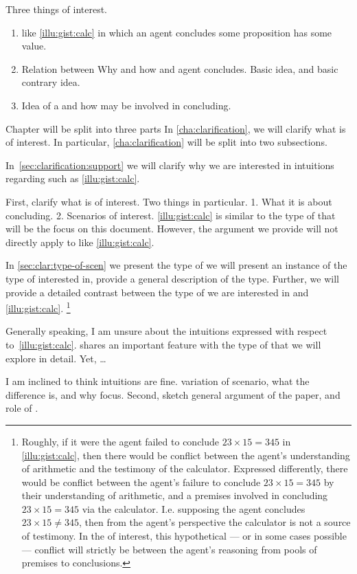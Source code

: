\begin{note}
  Three things of interest.

  \begin{enumerate}
  \item
     like \autoref{illu:gist:calc} in which an agent concludes some proposition has some value.
  \item
    Relation between Why and how and agent concludes.
    Basic idea, and basic contrary idea.
  \item
    Idea of a \fc{} and how  may be involved in concluding.
  \end{enumerate}


  Chapter will be split into three parts
  In \autoref{cha:clarification}, we will clarify what is of interest.
  In particular, \autoref{cha:clarification} will be split into two subsections.

  In~\autoref{sec:clarification:support} we will clarify why we are interested in intuitions regarding  such as \autoref{illu:gist:calc}.


  First, clarify what is of interest.
  Two things in particular.
  1. What it is about concluding.
  2. Scenarios of interest.
  \autoref{illu:gist:calc} is similar to the type of  that will be the focus on this document.
  However, the argument we provide will not directly apply to  like \autoref{illu:gist:calc}.

  In \autoref{sec:clar:type-of-scen} we present the type of  we will present an instance of the type of  interested in, provide a general description of the  type.
  Further, we will provide a detailed contrast between the type of  we are interested in and \autoref{illu:gist:calc}.%
  \footnote{
    Roughly, if it were the agent failed to conclude \(23 \times 15 = 345\) in \autoref{illu:gist:calc}, then there would be conflict between the agent's understanding of arithmetic and the testimony of the calculator.
    Expressed differently, there would be conflict between the agent's failure to conclude \(23 \times 15 = 345\) by their understanding of arithmetic, and a premises involved in concluding \(23 \times 15 = 345\) via the calculator.
    I.e. supposing the agent concludes \(23 \times 15 \ne 345\), then from the agent's perspective the calculator is not a source of testimony.
    In the  of interest, this hypothetical --- or in some cases possible --- conflict will strictly be between the agent's reasoning from pools of premises to conclusions.
  }

  Generally speaking, I am unsure about the intuitions expressed with respect to~\autoref{illu:gist:calc}.
   shares an important feature with the type of  that we will explore in detail.
  Yet, \dots

  I am inclined to think intuitions are fine.
  variation of scenario, what the difference is, and why focus.
  Second, sketch general argument of the paper, and role of .
\end{note}



